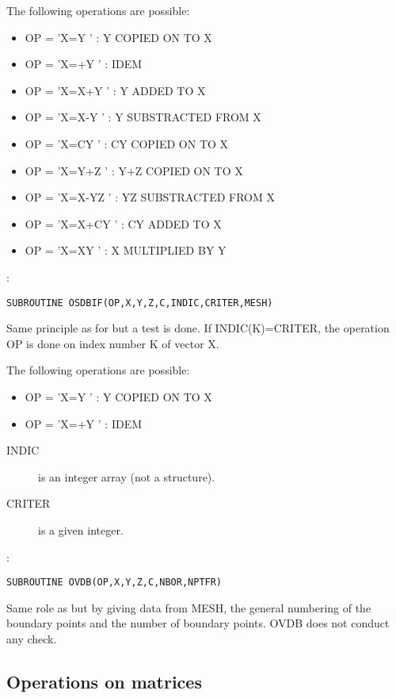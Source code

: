 The following operations are possible:
\begin{itemize}
  \item OP = 'X=Y     ' : Y COPIED ON TO X
  \item OP = 'X=+Y    ' : IDEM
  \item OP = 'X=X+Y   ' : Y ADDED TO X
  \item OP = 'X=X-Y   ' : Y SUBSTRACTED FROM X
  \item OP = 'X=CY    ' : CY COPIED ON TO X
  \item OP = 'X=Y+Z   ' : Y+Z COPIED ON TO X
  \item OP = 'X=X-YZ  ' : YZ SUBSTRACTED FROM X
  \item OP = 'X=X+CY  ' : CY ADDED TO X
  \item OP = 'X=XY    ' : X MULTIPLIED BY Y
\end{itemize}

:
\begin{lstlisting}[language=TelFortran]
SUBROUTINE OSDBIF(OP,X,Y,Z,C,INDIC,CRITER,MESH)
\end{lstlisting}

Same principle as for  but a test is done. If INDIC(K)=CRITER, the
operation OP is done on index number K of vector X.

The following operations are possible:
\begin{itemize}
  \item OP = 'X=Y     ' : Y COPIED ON TO X
  \item OP = 'X=+Y    ' : IDEM
\end{itemize}

\begin{description}
\item [INDIC] is an integer array (not a structure).
\item [CRITER] is a given integer.
\end{description}

:
\begin{lstlisting}[language=TelFortran]
SUBROUTINE OVDB(OP,X,Y,Z,C,NBOR,NPTFR)
\end{lstlisting}

Same role as  but by giving data from MESH, the general numbering of the
boundary points and the number of boundary points. OVDB does not conduct any
check.

\subsection{Operations on matrices}

